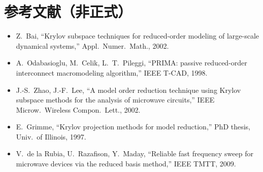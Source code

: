 \documentclass[11pt,a4paper]{ctexart}
\begin{document}
\section{参考文献（非正式）}

\begin{itemize}
\item Z.\ Bai, ``Krylov subspace techniques for reduced-order modeling of large-scale dynamical systems,'' Appl.\ Numer.\ Math., 2002.
\item A.\ Odabasioglu, M.\ Celik, L.~T.\ Pileggi, ``PRIMA: passive reduced-order interconnect macromodeling algorithm,'' IEEE T-CAD, 1998.
\item J.-S.\ Zhao, J.-F.\ Lee, ``A model order reduction technique using Krylov subspace methods for the analysis of microwave circuits,'' IEEE Microw.\ Wireless Compon.\ Lett., 2002.
\item E.\ Grimme, ``Krylov projection methods for model reduction,'' PhD thesis, Univ.\ of Illinois, 1997.
\item V.\ de la Rubia, U.\ Razafison, Y.\ Maday, ``Reliable fast frequency sweep for microwave devices via the reduced basis method,'' IEEE TMTT, 2009.
\end{itemize}
\end{document}
